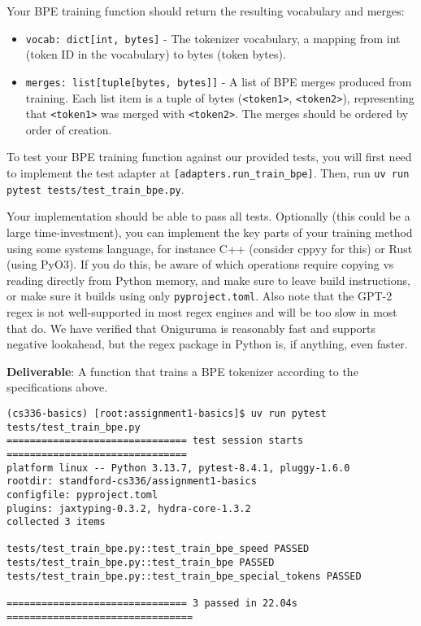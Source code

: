 \documentclass{article}
\begin{document}
Your BPE training function should return the resulting vocabulary and merges:

\begin{itemize}
    \item \lstinline{vocab: dict[int, bytes]} - The tokenizer vocabulary, a mapping from int (token ID in the vocabulary) to bytes (token bytes).
    \item \lstinline{merges: list[tuple[bytes, bytes]]} - A list of BPE merges produced from training. Each list item is a tuple of bytes (\texttt{<token1>}, \texttt{<token2>}), representing that \texttt{<token1>} was merged with \texttt{<token2>}. The merges should be ordered by order of creation.
\end{itemize}

To test your BPE training function against our provided tests, you will first need to implement the test adapter at \texttt{[adapters.run\_train\_bpe]}. Then, run \texttt{uv run pytest tests/test\_train\_bpe.py}.

Your implementation should be able to pass all tests. Optionally (this could be a large time-investment), you can implement the key parts of your training method using some systems language, for instance C++ (consider cppyy for this) or Rust (using PyO3). If you do this, be aware of which operations require copying vs reading directly from Python memory, and make sure to leave build instructions, or make sure it builds using only \texttt{pyproject.toml}. Also note that the GPT-2 regex is not well-supported in most regex engines and will be too slow in most that do. We have verified that Oniguruma is reasonably fast and supports negative lookahead, but the regex package in Python is, if anything, even faster.

\textbf{Deliverable}: A function that trains a BPE tokenizer according to the specifications above.

\begin{lstlisting}
(cs336-basics) [root:assignment1-basics]$ uv run pytest tests/test_train_bpe.py
=============================== test session starts ===============================
platform linux -- Python 3.13.7, pytest-8.4.1, pluggy-1.6.0
rootdir: standford-cs336/assignment1-basics
configfile: pyproject.toml
plugins: jaxtyping-0.3.2, hydra-core-1.3.2
collected 3 items                                                                         

tests/test_train_bpe.py::test_train_bpe_speed PASSED
tests/test_train_bpe.py::test_train_bpe PASSED
tests/test_train_bpe.py::test_train_bpe_special_tokens PASSED

=============================== 3 passed in 22.04s ================================
\end{lstlisting}
\end{document}
